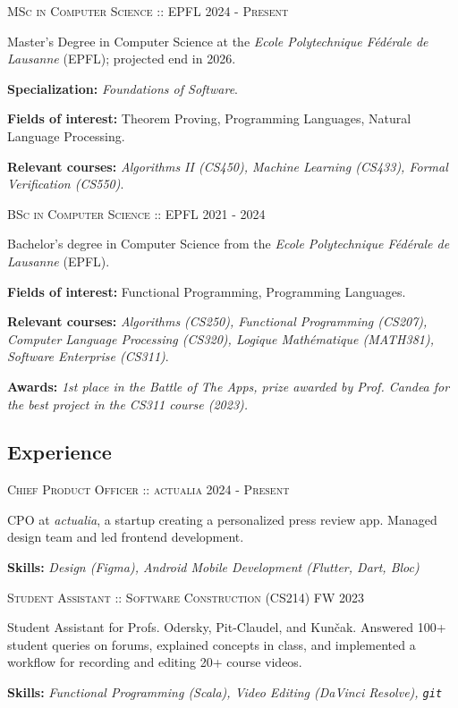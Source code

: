 \documentclass[11pt]{article}
\renewcommand{\line}[2]{{\vspace{4pt} \large \noindent\textsc{#1} \hfill \small{#2}}\vspace{0pt}}
\begin{document}
  \line{MSc in Computer Science :: EPFL}{2024 - \textsc{Present}}

  Master's Degree in Computer Science at the \textit{Ecole Polytechnique Fédérale de Lausanne} (EPFL); projected end in 2026.

  \textbf{Specialization:} \textit{Foundations of Software}.

  \textbf{Fields of interest:} Theorem Proving, Programming Languages, Natural Language Processing.

  \textbf{Relevant courses:} \textit{Algorithms II (CS450), Machine Learning (CS433), Formal Verification (CS550)}.

  \vspace{0.75em}
  \line{BSc in Computer Science :: EPFL}{2021 - 2024}

  Bachelor's degree in Computer Science from the \textit{Ecole Polytechnique Fédérale de Lausanne} (EPFL).

  \textbf{Fields of interest:} Functional Programming, Programming Languages.

  \textbf{Relevant courses:} \textit{Algorithms (CS250), Functional Programming (CS207), Computer Language Processing (CS320), Logique Mathématique (MATH381), Software Enterprise (CS311)}.

\textbf{Awards:} \textit{1st place in the Battle of The Apps, prize awarded by Prof. Candea for the best project in the CS311 course (2023).}
  \subsection*{Experience}

  \line{Chief Product Officer :: actualia}{2024 - \textsc{Present}}

  CPO at \textit{actualia}, a startup creating a personalized press review app. Managed design team and led frontend development.

  \textbf{Skills:} \textit{Design (Figma), Android Mobile Development (Flutter, Dart, Bloc)}
  \vspace{0.75em}

  \line{Student Assistant :: Software Construction (CS214)}{FW 2023}

  Student Assistant for Profs. Odersky, Pit-Claudel, and Kunčak. Answered 100+ student queries on forums, explained concepts in class, and implemented a workflow for recording and editing 20+ course videos.

  \textbf{Skills:} \textit{Functional Programming (Scala), Video Editing (DaVinci Resolve), \emph{\texttt{git}}}
  \vspace{0.75em}
\end{document}
